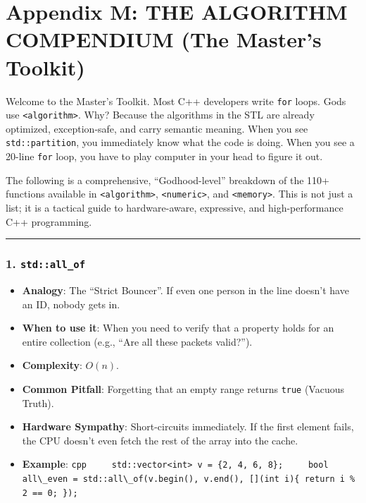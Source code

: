 \hypertarget{appendix-m-the-algorithm-compendium-the-masters-toolkit}{%
\section{Appendix M: THE ALGORITHM COMPENDIUM (The Master's
Toolkit)}\label{appendix-m-the-algorithm-compendium-the-masters-toolkit}}

Welcome to the Master's Toolkit. Most C++ developers write
\passthrough{\lstinline!for!} loops. Gods use
\passthrough{\lstinline!<algorithm>!}. Why? Because the algorithms in
the STL are already optimized, exception-safe, and carry semantic
meaning. When you see \passthrough{\lstinline!std::partition!}, you
immediately know what the code is doing. When you see a 20-line
\passthrough{\lstinline!for!} loop, you have to play computer in your
head to figure it out.

The following is a comprehensive, ``Godhood-level'' breakdown of the
110+ functions available in \passthrough{\lstinline!<algorithm>!},
\passthrough{\lstinline!<numeric>!}, and
\passthrough{\lstinline!<memory>!}. This is not just a list; it is a
tactical guide to hardware-aware, expressive, and high-performance C++
programming.

\begin{center}\rule{0.5\linewidth}{0.5pt}\end{center}

\hypertarget{stdall_of}{%
\subsubsection{\texorpdfstring{1.
\texttt{std::all\_of}}{1. std::all\_of}}\label{stdall_of}}

\begin{itemize}
\tightlist
\item
  \textbf{Analogy}: The ``Strict Bouncer''. If even one person in the
  line doesn't have an ID, nobody gets in.
\item
  \textbf{When to use it}: When you need to verify that a property holds
  for an entire collection (e.g., ``Are all these packets valid?'').
\item
  \textbf{Complexity}: \(O(n)\).
\item
  \textbf{Common Pitfall}: Forgetting that an empty range returns
  \passthrough{\lstinline!true!} (Vacuous Truth).
\item
  \textbf{Hardware Sympathy}: Short-circuits immediately. If the first
  element fails, the CPU doesn't even fetch the rest of the array into
  the cache.
\item
  \textbf{Example}:
  \passthrough{\lstinline!cpp     std::vector<int> v = \{2, 4, 6, 8\};     bool all\_even = std::all\_of(v.begin(), v.end(), [](int i)\{ return i \% 2 == 0; \});!}
\end{itemize}

